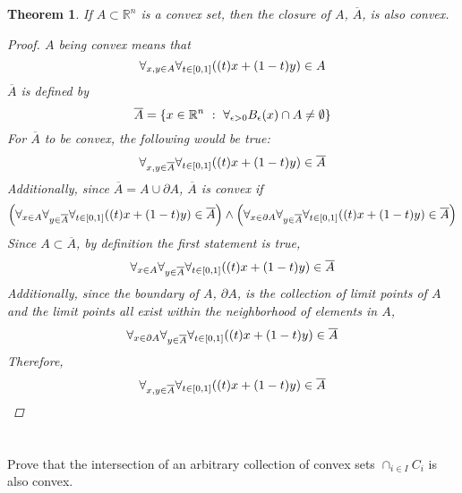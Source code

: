 \documentclass[]{article}
\newcommand{\R}{\mathbb{R}}
\newcommand{\st}{\ : \ }
\newtheorem{theorem}{Theorem}
\begin{document}
\begin{theorem}
    If $A \subset \R^n$ is a convex set,
    then the closure of $A$, $\overline{A}$, is also convex.
    \begin{proof}
        $A$ being convex means that\[
            \forall_{x, y \in A} \forall_{t \in [0, 1]}
            \qty((t) x + (1 - t) y) \in A
        \]
        $\overline{A}$ is defined by\[
            \overline{A} = \qty{
                x \in \R^n \st \forall_{\epsilon > 0} B_\epsilon(x) \cap A \neq \emptyset
            }
        \]
        For $\overline{A}$ to be convex, the following would be true:\[
            \forall_{x, y \in \overline{A}} \forall_{t \in [0,1]} 
                \qty((t) x + (1 - t) y) \in \overline{A}
        \]
        Additionally, since $\overline{A} = A \cup \partial A$, $\overline{A}$ is convex if
        \[
            \qty(
                \forall_{x \in A} \forall_{y \in \overline{A}} \forall_{t \in [0,1]} 
                    \qty((t) x + (1 - t) y) \in \overline{A}
            ) \land \qty(
                \forall_{x \in \partial A} \forall_{y \in \overline{A}} \forall_{t \in [0,1]} 
                    \qty((t) x + (1 - t) y) \in \overline{A}
            )
        \]
        Since $A \subset \overline{A}$, by definition the first statement is true, \[
            \forall_{x \in A} \forall_{y \in \overline{A}} \forall_{t \in [0,1]} 
                \qty((t) x + (1 - t) y) \in \overline{A}
        \]
        Additionally, since the boundary of $A$, $\partial A$, is the collection of limit points of $A$ and the limit points all exist within the neighborhood of elements in $A$, \[
            \forall_{x \in \partial A} \forall_{y \in \overline{A}} \forall_{t \in [0,1]} 
                    \qty((t) x + (1 - t) y) \in \overline{A}
        \]
        Therefore,
        \[
            \forall_{x, y \in \overline{A}} \forall_{t \in [0,1]} 
                \qty((t) x + (1 - t) y) \in \overline{A}
        \]
    \end{proof}
\end{theorem}

\newpage
\section{}
Prove that the intersection of an arbitrary collection of convex sets $\cap_{i \in I} C_i$ is also convex.
\end{document}
